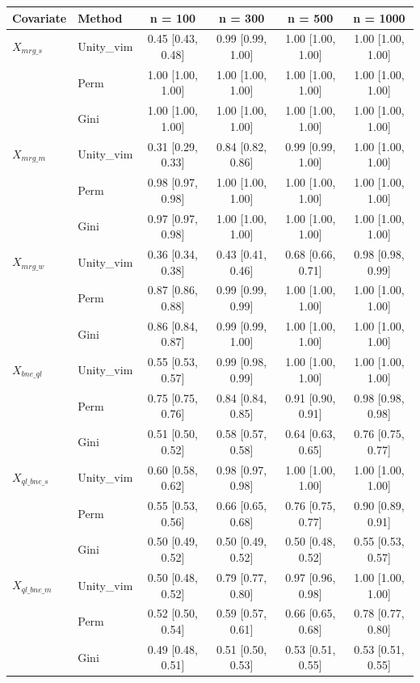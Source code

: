 
\begin{tabular}{llcccc}
\toprule
Covariate & Method & n = 100 & n = 300 & n = 500 & n = 1000\\
\midrule
$X_{mrg\_s}$ & Unity\_vim & 0.45 [0.43, 0.48] & 0.99 [0.99, 1.00] & 1.00 [1.00, 1.00] & 1.00 [1.00, 1.00]\\
 & Perm & 1.00 [1.00, 1.00] & 1.00 [1.00, 1.00] & 1.00 [1.00, 1.00] & 1.00 [1.00, 1.00]\\
 & Gini & 1.00 [1.00, 1.00] & 1.00 [1.00, 1.00] & 1.00 [1.00, 1.00] & 1.00 [1.00, 1.00]\\
$X_{mrg\_m}$ & Unity\_vim & 0.31 [0.29, 0.33] & 0.84 [0.82, 0.86] & 0.99 [0.99, 1.00] & 1.00 [1.00, 1.00]\\
 & Perm & 0.98 [0.97, 0.98] & 1.00 [1.00, 1.00] & 1.00 [1.00, 1.00] & 1.00 [1.00, 1.00]\\
 & Gini & 0.97 [0.97, 0.98] & 1.00 [1.00, 1.00] & 1.00 [1.00, 1.00] & 1.00 [1.00, 1.00]\\
$X_{mrg\_w}$ & Unity\_vim & 0.36 [0.34, 0.38] & 0.43 [0.41, 0.46] & 0.68 [0.66, 0.71] & 0.98 [0.98, 0.99]\\
 & Perm & 0.87 [0.86, 0.88] & 0.99 [0.99, 0.99] & 1.00 [1.00, 1.00] & 1.00 [1.00, 1.00]\\
 & Gini & 0.86 [0.84, 0.87] & 0.99 [0.99, 1.00] & 1.00 [1.00, 1.00] & 1.00 [1.00, 1.00]\\
$X_{bne\_ql}$ & Unity\_vim & 0.55 [0.53, 0.57] & 0.99 [0.98, 0.99] & 1.00 [1.00, 1.00] & 1.00 [1.00, 1.00]\\
 & Perm & 0.75 [0.75, 0.76] & 0.84 [0.84, 0.85] & 0.91 [0.90, 0.91] & 0.98 [0.98, 0.98]\\
 & Gini & 0.51 [0.50, 0.52] & 0.58 [0.57, 0.58] & 0.64 [0.63, 0.65] & 0.76 [0.75, 0.77]\\
$X_{ql\_bne\_s}$ & Unity\_vim & 0.60 [0.58, 0.62] & 0.98 [0.97, 0.98] & 1.00 [1.00, 1.00] & 1.00 [1.00, 1.00]\\
 & Perm & 0.55 [0.53, 0.56] & 0.66 [0.65, 0.68] & 0.76 [0.75, 0.77] & 0.90 [0.89, 0.91]\\
 & Gini & 0.50 [0.49, 0.52] & 0.50 [0.49, 0.52] & 0.50 [0.48, 0.52] & 0.55 [0.53, 0.57]\\
$X_{ql\_bne\_m}$ & Unity\_vim & 0.50 [0.48, 0.52] & 0.79 [0.77, 0.80] & 0.97 [0.96, 0.98] & 1.00 [1.00, 1.00]\\
 & Perm & 0.52 [0.50, 0.54] & 0.59 [0.57, 0.61] & 0.66 [0.65, 0.68] & 0.78 [0.77, 0.80]\\
 & Gini & 0.49 [0.48, 0.51] & 0.51 [0.50, 0.53] & 0.53 [0.51, 0.55] & 0.53 [0.51, 0.55]\\

\end{tabular}
